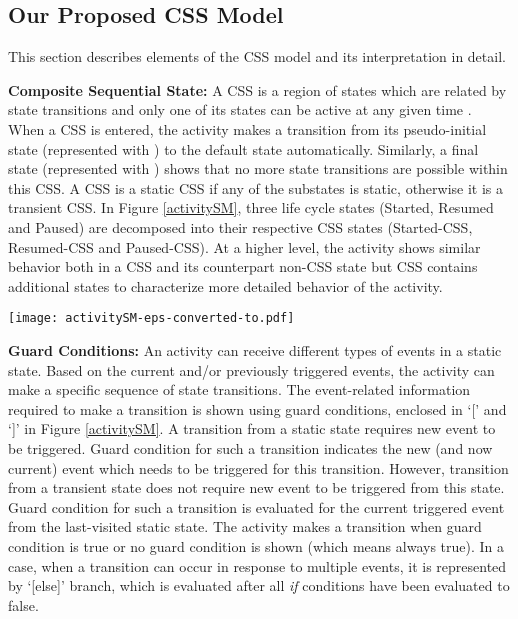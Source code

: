 \documentclass[10pt]{elsarticle}
\begin{document}
\newcommand\bulletarrow{{\ooalign{\raise0.01ex\hbox{\scalebox{2}{}}}}}


\subsection{Our Proposed CSS Model}  \label{cssModel}

This section describes elements of the CSS model and its interpretation in detail. 

{\noindent \bf Composite Sequential State:} A CSS is a region of states which are related by state transitions and only one of its states can be active at any given time \cite{BoochUML}. When a CSS is entered, the activity makes a transition from its pseudo-initial state (represented with \bulletarrow) to the default state automatically. Similarly, a final state (represented with \mycircle) shows that no more state transitions are possible within this CSS. A CSS is a static CSS if any of the substates is static, otherwise it is a transient CSS. In Figure \ref{activitySM}, three life cycle states (Started, Resumed and Paused) are decomposed into their respective CSS states (Started-CSS, Resumed-CSS and Paused-CSS). At a higher level, the activity shows similar behavior both in a CSS and its counterpart non-CSS state but CSS contains additional states to characterize more detailed behavior of the activity. 


\begin{comment}
\begin{figure*}
  \centering
  \epsfig{file=activitySM.eps, width=140mm}
  \caption{Composite Sequential State Model (The Reverse-engineered Activity Life Cycle Model)}
  \label{activitySM}
\end{figure*}
\end{comment}

\begin{figure*}
\centering
\texttt{[image: activitySM-eps-converted-to.pdf]}
\caption{Composite Sequential State Model (The Reverse-engineered Activity Life Cycle Model}
\label{activitySM}
\end{figure*}


{\noindent \bf Guard Conditions:} An activity can receive different types of events in a static state. Based on the current and/or previously triggered events, the activity can make a specific sequence of state transitions. The event-related information required to make a transition is shown using guard conditions, enclosed in `[' and `]' in Figure \ref{activitySM}. A transition from a static state requires new event to be triggered. Guard condition for such a transition indicates the new (and now current) event which needs to be triggered for this transition. However, transition from a transient state does not require new event to be triggered from this state. Guard condition for such a transition is evaluated for the current triggered event from the last-visited static state. The activity makes a transition when guard condition is true or no guard condition is shown (which means always true). In a case, when a transition can occur in response to multiple events, it is represented by `[else]' branch, which is evaluated after all \emph{if} conditions have been evaluated to false. 
\end{document}
